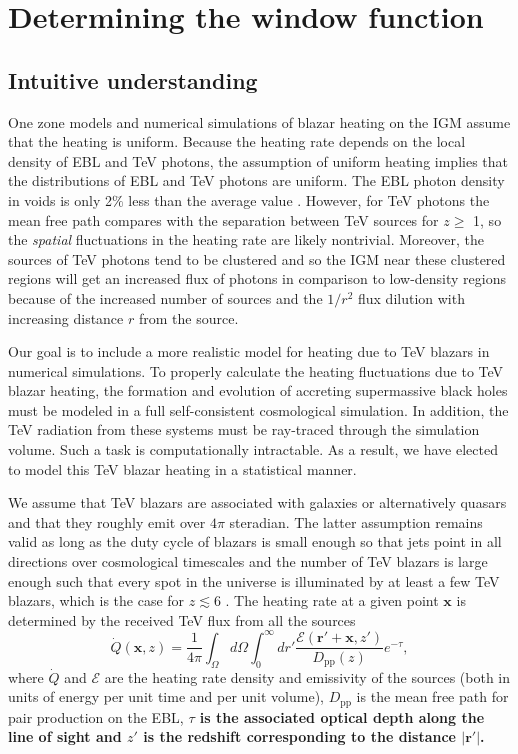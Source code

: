 \documentclass[numberedappendix]{emulateapj}
\newcommand\Ec[1]{{\color{magenta} \bf #1}} %
\begin{document}
\section {Determining the window function}\label{window}
\subsection{Intuitive understanding}
One zone models \citep{2012ApJ...752...23C,2012ApJ...752...24P} and numerical simulations \citep{2012MNRAS.423..149P} of blazar heating on the IGM assume that the heating is uniform. Because the heating rate depends on the local density of EBL and TeV photons, the assumption of uniform heating implies that the distributions of EBL and TeV photons are uniform. The EBL photon density in voids is only 2$\%$ less than the average value \citep{2015MNRAS.446.2267F}. However, for TeV photons the mean free path compares with the separation between TeV sources for $z\geqslant$ 1, so the {\it spatial} fluctuations in the heating rate are likely nontrivial. Moreover, the sources of TeV photons tend to be clustered and so the IGM near these clustered regions will get an increased flux of photons in comparison to low-density regions because of the increased number of sources and the $1/r^2$ flux dilution with increasing distance $r$ from the source.

Our goal is to include a more realistic model for heating due to TeV blazars in numerical simulations.
To properly calculate the heating fluctuations due to TeV blazar heating, the formation and evolution of accreting supermassive black holes must be modeled in a full self-consistent cosmological simulation. In addition, the TeV radiation from these systems must be ray-traced through the simulation volume. Such a task is computationally intractable. As a result, we have elected to model this TeV blazar heating in a statistical manner.

We assume that TeV blazars are associated with galaxies or alternatively quasars and that they roughly emit over $4\pi$ steradian. The latter assumption remains valid as long as the duty cycle of blazars is small enough so that jets point in all directions over cosmological timescales and the number of TeV blazars is large enough such that every spot in the universe is illuminated by at least a few TeV blazars, which is the case for $z\lesssim 6$ \citep{2012ApJ...752...23C}.
The heating rate at a given point $\mathbf{x}$ is determined by the received TeV flux from all the sources 
\begin{equation}
\label{eq:heating_rate}
\dot{Q}(\mathbf{x},z)= \frac{1}{4\pi} \int_{\Omega} d\Omega\int_0^{\infty} dr'\frac{\mathcal{E}(\mathbf{r}'+\mathbf{x},z')}{D_{\mathrm{pp}}(z)} e^{-\tau},
\end{equation}
where $\dot{Q}$ and $\mathcal{E}$ are the heating rate density and emissivity of the sources (both in units of energy per unit time and per unit volume), $D_{\mathrm{pp}}$ is the mean free path for pair production on the EBL, \Ec{$\tau$ is the associated optical depth along the line of sight and $z'$ is the redshift corresponding to the distance $|\mathbf{r}'|$.}
\end{document}
